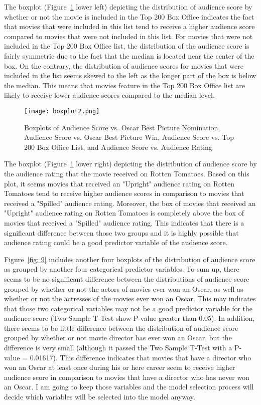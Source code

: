 The boxplot (Figure~\ref{fig: 8} lower left) depicting the distribution of audience score by whether or not the movie is included in the Top 200 Box Office indicates the fact that movies that were included in this list tend to receive a higher audience score compared to movies that were not included in this list. For movies that were not included in the Top 200 Box Office list, the distribution of the audience score is fairly symmetric due to the fact that the median is located near the center of the box. On the contrary, the distribution of audience scores for movies that were included in the list seems skewed to the left as the longer part of the box is below the median. This means that movies feature in the Top 200 Box Office list are likely to receive lower audience scores compared to the median level.

\begin{figure}[htbp]
\begin{center}
\caption{Boxplots of Audience Score vs. Oscar Best Picture Nomination, Audience Score vs. Oscar Best Picture Win, Audience Score vs. Top 200 Box Office List, and Audience Score vs. Audience Rating}
\texttt{[image: boxplot2.png]}
\label{fig: 8}
\end{center}
\end{figure}

The boxplot (Figure~\ref{fig: 8} lower right) depicting the distribution of audience score by the audience rating that the movie received on Rotten Tomatoes. Based on this plot, it seems movies that received an "Upright" audience rating on Rotten Tomatoes tend to receive higher audience scores in comparison to movies that received a "Spilled" audience rating. Moreover, the box of movies that received an "Upright" audience rating on Rotten Tomatoes is completely above the box of movies that received a "Spilled" audience rating. This indicates that there is a significant difference between those two groups and it is highly possible that audience rating could be a good predictor variable of the audience score.

Figure~\ref{fig: 9} includes another four boxplots of the distribution of audience score as grouped by another four categorical predictor variables. To sum up, there seems to be no significant difference between the distributions of audience score grouped by whether or not the actors of movies ever won an Oscar, as well as whether or not the actresses of the movies ever won an Oscar. This may indicates that those two categorical variables may not be a good predictor variable for the audience score (Two Sample T-Test show P-value greater than 0.05). In addition, there seems to be little difference between the distribution of audience score grouped by whether or not movie director has ever won an Oscar, but the difference is very small (although it passed the Two Sample T-Test with a P-value = 0.01617). This difference indicates that movies that have a director who won an Oscar at least once during his or here career seem to receive higher audience score in comparison to movies that have a director who has never won an Oscar. I am going to keep those variables and the model selection process will decide which variables will be selected into the model anyway.

